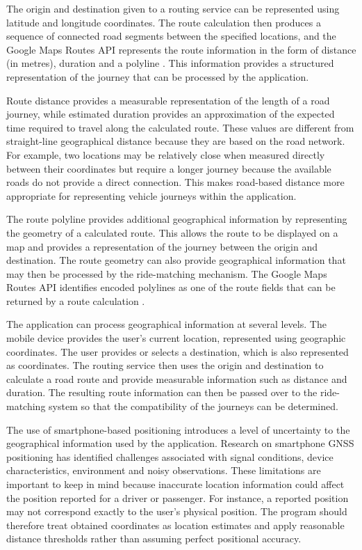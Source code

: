 The origin and destination given to a routing service can be represented using latitude and longitude coordinates. The route calculation then produces a sequence of connected road segments between the specified locations, and the Google Maps Routes API represents the route information in the form of distance (in metres), duration and a polyline \citep{google2026a}. This information provides a structured representation of the journey that can be processed by the application.

Route distance provides a measurable representation of the length of a road journey, while estimated duration provides an approximation of the expected time required to travel along the calculated route. These values are different from straight-line geographical distance because they are based on the road network. For example, two locations may be relatively close when measured directly between their coordinates but require a longer journey because the available roads do not provide a direct connection. This makes road-based distance more appropriate for representing vehicle journeys within the application.

The route polyline provides additional geographical information by representing the geometry of a calculated route. This allows the route to be displayed on a map and provides a representation of the journey between the origin and destination. The route geometry can also provide geographical information that may then be processed by the ride-matching mechanism. The Google Maps Routes API identifies encoded polylines as one of the route fields that can be returned by a route calculation \citep{google2026a}.

The application can process geographical information at several levels. The mobile device provides the user's current location, represented using geographic coordinates. The user provides or selects a destination, which is also represented as coordinates. The routing service then uses the origin and destination to calculate a road route and provide measurable information such as distance and duration. The resulting route information can then be passed over to the ride-matching system so that the compatibility of the journeys can be determined.

The use of smartphone-based positioning introduces a level of uncertainty to the geographical information used by the application. Research on smartphone GNSS positioning has identified challenges associated with signal conditions, device characteristics, environment and noisy observations. These limitations are important to keep in mind because inaccurate location information could affect the position reported for a driver or passenger. For instance, a reported position may not correspond exactly to the user's physical position. The program should therefore treat obtained coordinates as location estimates and apply reasonable distance thresholds rather than assuming perfect positional accuracy.

